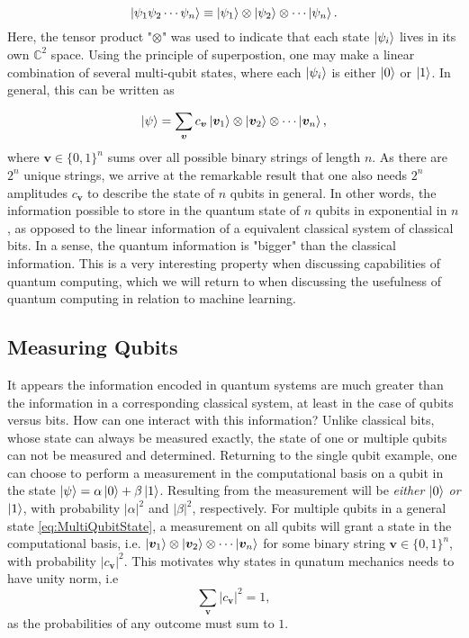 \begin{equation}
\ket{\psi_1 \psi_2 \cdots \psi_n} \equiv \ket{\psi_1} \otimes \ket{\psi_2} \otimes \cdots \ket{\psi_n}.
\end{equation}
Here, the tensor product "$\otimes$" was used to indicate that each state $\ket{\psi_i}$ lives in its own $\mathbb{C}^2$ space. Using the principle of superpostion, one may make a linear combination of several multi-qubit states, where each $\ket{\psi_i}$ is either $\ket{0}$ or $\ket{1}$. In general, this can be written as

\begin{equation}\label{eq:MultiQubitState}
\ket{\psi} = \sum_{\boldsymbol{v}}c_{\boldsymbol{v}}\ket{\boldsymbol{v}_1} \otimes \ket{\boldsymbol{v}_2} \otimes \cdots \ket{\boldsymbol{v}_n},
\end{equation}
where $\boldsymbol{v} \in \{0,1\}^n$ sums over all possible binary strings of length $n$. As there are $2^n$ unique strings, we arrive at the remarkable result that one also needs $2^n$ amplitudes $c_{\boldsymbol{v}}$ to describe the state of $n$ qubits in general. In other words, the information possible to store in the quantum state of $n$ qubits in exponential in $n$, as opposed to the linear information of a equivalent classical system of classical bits. In a sense, the quantum information is "bigger" than the classical information. This is a very interesting property when discussing capabilities of quantum computing, which we will return to when discussing the usefulness of quantum computing in relation to machine learning.

\subsection{Measuring Qubits}\label{sec:MeasuringState}
It appears the information encoded in quantum systems are much greater than the information in a corresponding classical system, at least in the case of qubits versus bits. How can one interact with this information? Unlike classical bits, whose state can always be measured exactly, the state of one or multiple qubits can not be measured and determined. Returning to the single qubit example, one can choose to perform a measurement in the computational basis on a qubit in the state $\ket{\psi} = \alpha \ket{0} + \beta \ket{1}$. Resulting from the measurement will be \emph{either} $\ket{0}$ \emph{or} $\ket{1}$, with probability $|\alpha|^2$ and $|\beta|^2$, respectively. For multiple qubits in a general state \autoref{eq:MultiQubitState}, a measurement on all qubits will grant a state in the computational basis, i.e. $\ket{\boldsymbol{v}_1} \otimes \ket{\boldsymbol{v}_2} \otimes \cdots \ket{\boldsymbol{v}_n}$ for some binary string $\boldsymbol{v} \in \{0,1\}^n$, with probability $|c_{\boldsymbol{v}}|^2$. This motivates why states in qunatum mechanics needs to have unity norm, i.e
\begin{equation}\label{eq:MultiQubitState}
\sum_{\boldsymbol{v}}|c_{\boldsymbol{v}}|^2 = 1,
\end{equation} 
as the probabilities of any outcome must sum to $1$.


